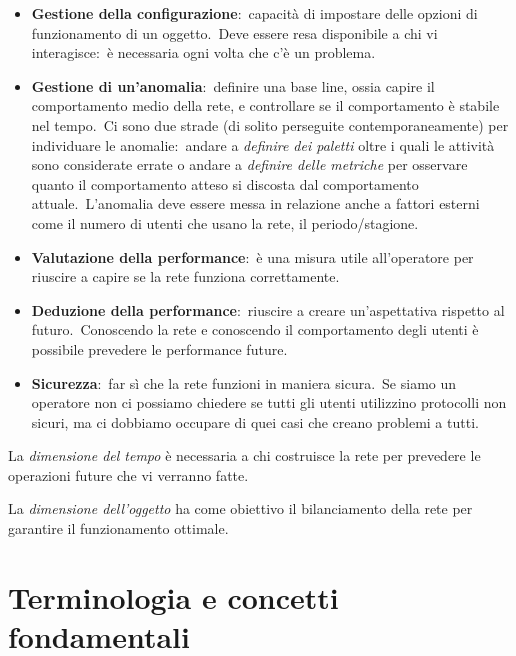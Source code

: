 \begin{itemize}
    \item \textbf{Gestione della configurazione}:\ capacità di impostare delle opzioni di funzionamento di un oggetto.\ Deve essere resa disponibile a chi vi interagisce:\ è necessaria ogni volta che c'è un problema.
    \item \textbf{Gestione di un'anomalia}:\ definire una base line, ossia capire il comportamento medio della rete, e controllare se il comportamento è stabile nel tempo.\ Ci sono due strade (di solito perseguite contemporaneamente) per individuare le anomalie:\ andare a \textit{definire dei paletti} oltre i quali le attività sono considerate errate o andare a \textit{definire delle metriche} per osservare quanto il comportamento atteso si discosta dal comportamento attuale.\ L'anomalia deve essere messa in relazione anche a fattori esterni come il numero di utenti che usano la rete, il periodo/stagione.
    \item \textbf{Valutazione della performance}:\ è una misura utile all'operatore per riuscire a capire se la rete funziona correttamente.
    \item \textbf{Deduzione della performance}:\ riuscire a creare un'aspettativa rispetto al futuro.\ Conoscendo la rete e conoscendo il comportamento degli utenti è possibile prevedere le performance future.\
    \item \textbf{Sicurezza}:\ far sì che la rete funzioni in maniera sicura.\ Se siamo un operatore non ci possiamo chiedere se tutti gli utenti utilizzino protocolli non sicuri, ma ci dobbiamo occupare di quei casi che creano problemi a tutti.
\end{itemize}

\noindent La \textit{dimensione del tempo} è necessaria a chi costruisce la rete per prevedere le operazioni future che vi verranno fatte.

La \textit{dimensione dell'oggetto} ha come obiettivo il bilanciamento della rete per garantire il funzionamento ottimale.

\section{Terminologia e concetti fondamentali}

